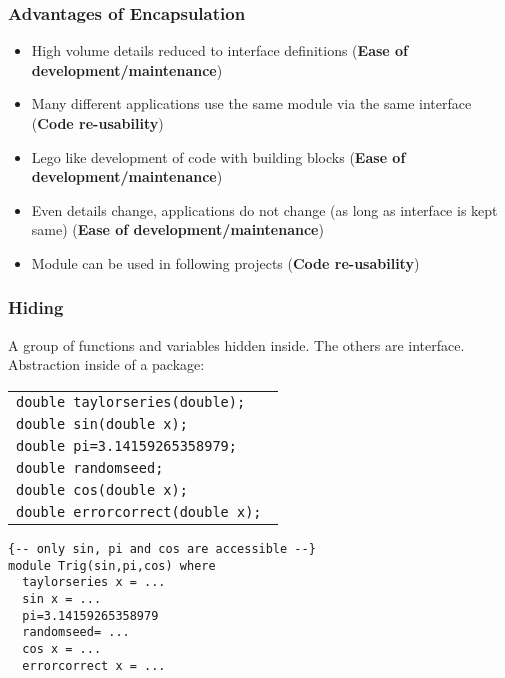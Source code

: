 \vspace*{\fill}
\columnbreak

\subsubsection*{Advantages of Encapsulation}
\label{subsubsec:adv-encap}

\begin{itemize}
  \item High volume details reduced to interface definitions (\textbf{Ease of development/maintenance})
  \item Many different applications use the same module via the same interface (\textbf{Code re-usability})
  \item Lego like development of code with building blocks (\textbf{Ease of
  development/maintenance}) 
  \item Even details change, applications do not change (as long as interface is kept same) (\textbf{Ease of development/maintenance})
  \item Module can be used in following projects (\textbf{Code re-usability})
\end{itemize}

\subsubsection*{Hiding}
\label{subsubsec:hiding}

A group of functions and variables hidden inside. The others are interface. Abstraction inside of a package:

\begin{table}[H]
  \begin{tabular}{|>{\tt}l|} \hline
    \color{gray}double taylorseries(double);  		\\
    double sin(double x);			\\
    double pi=3.14159265358979;		\\
    \color{gray}double randomseed;	\\
    double cos(double x);			\\
    \color{gray}double errorcorrect(double x); \\ \hline
  \end{tabular}
\end{table}
\begin{listing}[H]
\begin{verbatim}
{-- only sin, pi and cos are accessible --}
module Trig(sin,pi,cos) where
  taylorseries x = ... 
  sin x = ...
  pi=3.14159265358979
  randomseed= ...
  cos x = ...
  errorcorrect x = ...
\end{verbatim}
\caption{}
\label{code:code2}
\end{listing}
